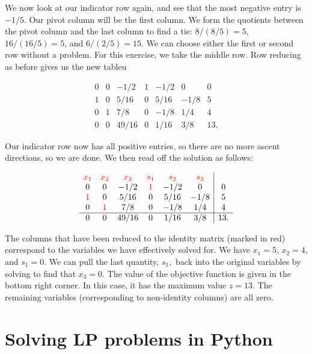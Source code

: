 \documentclass[12pt,english]{article}
\begin{document}
We now look at our indicator row again, and see that the most negative entry is $-1/5$.  Our pivot column will be the first column.  We form the quotients between the pivot column and the last column to find a tie: $8/(8/5) = 5$, $16/(16/5) = 5$, and $6/(2/5)=15$.  We can choose either the first or second row without a problem.  For this exercise, we take the middle row.   Row reducing as before gives us the new tableu

\begin{equation}
\begin{array}{cccccc|c}
0 	&	0	&	-1/2	&	1	&	-1/2	&	0 	&	0 \\
1	&	0	&	5/16	&	0	&	5/16	&	-1/8	&	5 \\
0	&	1	&	7/8	&	0	&	-1/8	&	1/4	&	4 \\
\hline
0	&	0	&   49/16  &	0	&	1/16	&	3/8	&	13.
\end{array}
\end{equation}

Our indicator row now has all positive entries, so there are no more ascent directions, so we are done.  We then read off the solution as follows:

\begin{equation}
\begin{array}{cccccc|c}
\textcolor{red}{x_1}   &     \textcolor{red}{x_2} 	& \textcolor{red}{x_3} & \textcolor{red}{s_1}  & \textcolor{red}{s_2} & \textcolor{red}{s_3}   & 	\\
0 				&	0				&	-1/2	&	\textcolor{red}{1}	&	-1/2	&	0 	&	0 \\
\textcolor{red}{1}	&	0				&	5/16	&	0				&	5/16	&	-1/8	&	5 \\
0				&	\textcolor{red}{1}	&	7/8	&	0				&	-1/8	&	1/4	&	4 \\
\hline
0				&	0				&   49/16  &	0				&	1/16	&	3/8	&	13.
\end{array}
\end{equation}

The columns that have been reduced to the identity matrix (marked in red) correspond to the variables we have effectively solved for.  We have $x_1 = 5$, $x_2 = 4$, and $s_1 = 0$.  We can pull the last quantity, $s_1,$ back into the original variables by solving to find that $x_3 = 0$.  The value of the objective function is given in the bottom right corner.  In this case, it has the maximum value $z = 13$.  The remaining variables (corresponding to non-identity columns) are all zero.

\section{Solving LP problems in Python}
\end{document}
